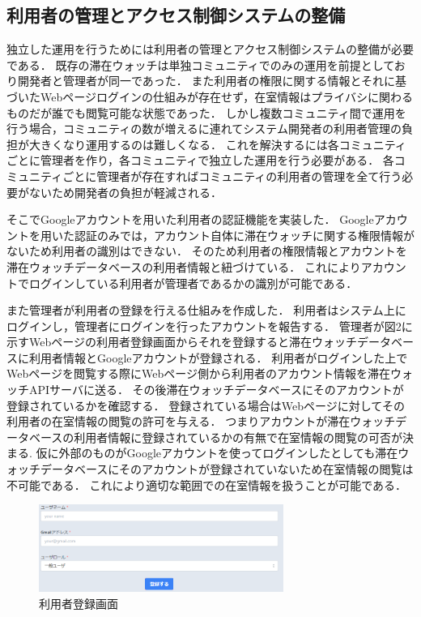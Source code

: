 
\subsection{利用者の管理とアクセス制御システムの整備}
独立した運用を行うためには利用者の管理とアクセス制御システムの整備が必要である．
既存の滞在ウォッチは単独コミュニティでのみの運用を前提としており開発者と管理者が同一であった．
また利用者の権限に関する情報とそれに基づいたWebページログインの仕組みが存在せず，在室情報はプライバシに関わるものだが誰でも閲覧可能な状態であった．
しかし複数コミュニティ間で運用を行う場合，コミュニティの数が増えるに連れてシステム開発者の利用者管理の負担が大きくなり運用するのは難しくなる．
これを解決するには各コミュニティごとに管理者を作り，各コミュニティで独立した運用を行う必要がある．
各コミュニティごとに管理者が存在すればコミュニティの利用者の管理を全て行う必要がないため開発者の負担が軽減される．

そこでGoogleアカウントを用いた利用者の認証機能を実装した．
Googleアカウントを用いた認証のみでは，アカウント自体に滞在ウォッチに関する権限情報がないため利用者の識別はできない．
そのため利用者の権限情報とアカウントを滞在ウォッチデータベースの利用者情報と紐づけている．
これによりアカウントでログインしている利用者が管理者であるかの識別が可能である．

また管理者が利用者の登録を行える仕組みを作成した．
利用者はシステム上にログインし，管理者にログインを行ったアカウントを報告する．
管理者が図2に示すWebページの利用者登録画面からそれを登録すると滞在ウォッチデータベースに利用者情報とGoogleアカウントが登録される．
利用者がログインした上でWebページを閲覧する際にWebページ側から利用者のアカウント情報を滞在ウォッチAPIサーバに送る．
その後滞在ウォッチデータベースにそのアカウントが登録されているかを確認する．
登録されている場合はWebページに対してその利用者の在室情報の閲覧の許可を与える．
つまりアカウントが滞在ウォッチデータベースの利用者情報に登録されているかの有無で在室情報の閲覧の可否が決まる.
仮に外部のものがGoogleアカウントを使ってログインしたとしても滞在ウォッチデータベースにそのアカウントが登録されていないため在室情報の閲覧は不可能である．
これにより適切な範囲での在室情報を扱うことが可能である．


\begin{figure}[tbh]
  \centering
  \includegraphics[width=8cm]{image/register.png}
  \caption{利用者登録画面}
  \label{multipleBPM}
\end{figure}